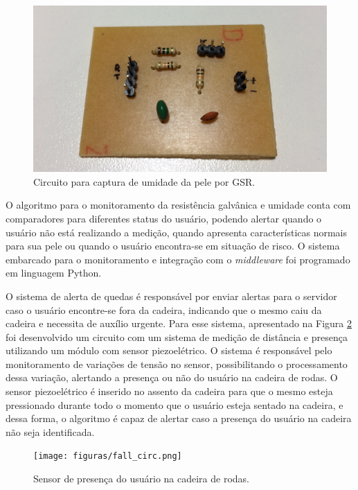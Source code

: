 \begin{figure}
    \begin{center}
        \includegraphics[scale=0.1]{figuras/gsr_circ.JPG}
    \end{center}
    \caption{Circuito para captura de umidade da pele por GSR.}
    \label{fig:gsr_circ}
\end{figure}

O algoritmo para o monitoramento da resistência galvânica e umidade conta com
comparadores para diferentes status do usuário, podendo alertar quando o usuário
não está realizando a medição, quando apresenta características normais para sua
pele ou quando o usuário encontra-se em situação de risco. O sistema embarcado para
o monitoramento e integração com o \textit{middleware} foi programado em linguagem Python.

O sistema de alerta de quedas é responsável por enviar alertas para o servidor
caso o usuário encontre-se fora da cadeira, indicando que o mesmo caiu da cadeira
e necessita de auxílio urgente. Para esse sistema, apresentado na Figura \ref{fig:fall_ele} foi desenvolvido um circuito
com um sistema de medição de distância e presença utilizando um módulo com sensor
piezoelétrico. O sistema é responsável pelo monitoramento de variações de tensão
no sensor, possibilitando o processamento dessa variação, alertando a presença
ou não do usuário na cadeira de rodas. O sensor piezoelétrico é inserido no assento
da cadeira para que o mesmo esteja pressionado durante todo o momento que o usuário
esteja sentado na cadeira, e dessa forma, o algoritmo é capaz de alertar caso a
presença do usuário na cadeira não seja identificada.

\begin{figure}
    \begin{center}
        \texttt{[image: figuras/fall\_circ.png]}
    \end{center}
    \caption{Sensor de presença do usuário na cadeira de rodas.}
    \label{fig:fall_ele}
\end{figure}


